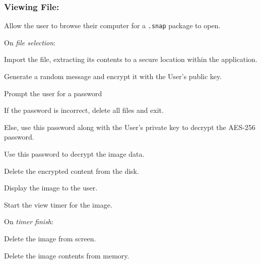 \documentclass[11pt, a4paper,titlepage]{report}
\begin{document}
\subsubsection{Viewing File:}
\begin{itemize*}
	\item Allow the user to browse their computer for a \texttt{.snap} package to open.
	\begin{itemize*}
		\item[] On \emph{file selection}:
		\begin{itemize*}
			\item Import the file, extracting its contents to a secure location within the application.
			\item Generate a random message and encrypt it with the User's public key.
			\item Prompt the user for a password
			\begin{itemize*}
				\item If the password is incorrect, delete all files and exit.
				\item Else, use this password along with the User's private key to decrypt the AES-256 password.
				\item Use this password to decrypt the image data.
				\item Delete the encrypted content from the disk.
				\item Display the image to the user.
				\item Start the view timer for the image.
			\end{itemize*}
		\end{itemize*}
		\item[] On \emph{timer finish}:
		\begin{itemize*}
			\item Delete the image from screen.
			\item Delete the image contents from memory.
		\end{itemize*}
	\end{itemize*}
\end{itemize*}
\end{document}

